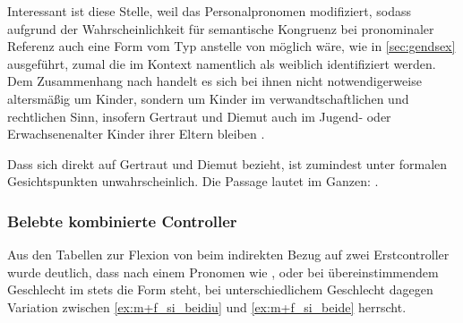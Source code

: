 Interessant ist diese Stelle, weil  das Personalpronomen
  modifiziert, sodass aufgrund der Wahrscheinlichkeit für
semantische Kongruenz bei pronominaler Referenz auch eine Form vom Typ
 anstelle von  möglich wäre, wie in \cref{sec:gendsex}
ausgeführt, zumal die   im Kontext namentlich als
weiblich identifiziert werden. Dem Zusammenhang nach handelt es sich bei ihnen
nicht notwendigerweise altersmäßig um Kinder, sondern um Kinder im
verwandt\-schaft\-lichen und rechtlichen Sinn, insofern Gertraut und Diemut
auch im Jugend- oder Erwachsenen\-alter Kinder ihrer Eltern bleiben
\autocites[\pno~2960, 240.31, 35]{cao4}[vgl.~auch][\pno~2719]{cao4}[569,
619]{caor}.

Dass sich  direkt auf Gertraut und Diemut bezieht, ist
zumindest unter formalen Gesichtspunkten unwahrscheinlich. Die Passage lautet
im Ganzen:  
\autocite[\pno~2960, 240.37--39]{cao4}.

\subsubsection{Belebte kombinierte Controller}

Aus den Tabellen  zur Flexion
von  beim indirekten Bezug auf zwei Erstcontroller wurde deutlich,
dass nach einem Pronomen wie
 ,   oder   bei übereinstimmendem Geschlecht im  stets die Form
 steht, bei unterschiedlichem Geschlecht dagegen Variation zwischen
 \cref{ex:m+f_si_beidiu} und  \cref{ex:m+f_si_beide}
herrscht.

